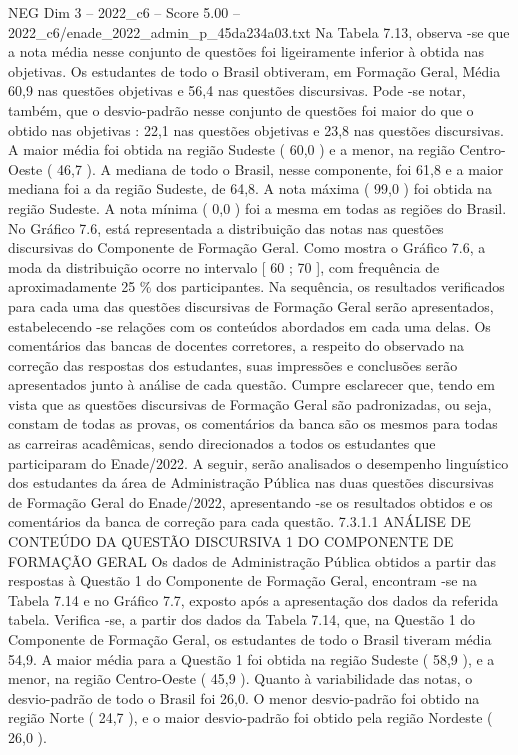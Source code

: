 \begin{textsample}{NEG Dim 3 – 2022\_c6 – Score 5.00 – 2022\_c6/enade\_2022\_admin\_p\_45da234a03.txt}
Na Tabela 7.13, observa -se que a nota média nesse conjunto de questões foi ligeiramente inferior à obtida nas objetivas.
Os estudantes de todo o Brasil obtiveram, em Formação Geral, Média 60,9 nas questões objetivas e 56,4 nas questões discursivas.
Pode -se notar, também, que o desvio-padrão nesse conjunto de questões foi maior do que o obtido nas objetivas : 22,1 nas questões objetivas e 23,8 nas questões discursivas.
A maior média foi obtida na região Sudeste ( 60,0 ) e a menor, na região Centro-Oeste ( 46,7 ).
A mediana de todo o Brasil, nesse componente, foi 61,8 e a maior mediana foi a da região Sudeste, de 64,8.
A nota máxima ( 99,0 ) foi obtida na região Sudeste.
A nota mínima ( 0,0 ) foi a mesma em todas as regiões do Brasil.
No Gráfico 7.6, está representada a distribuição das notas nas questões discursivas do Componente de Formação Geral.
Como mostra o Gráfico 7.6, a moda da distribuição ocorre no intervalo [ 60 ; 70 ], com frequência de aproximadamente 25 \% dos participantes.
Na sequência, os resultados verificados para cada uma das questões discursivas de Formação Geral serão apresentados, estabelecendo -se relações com os conteúdos abordados em cada uma delas.
Os comentários das bancas de docentes corretores, a respeito do observado na correção das respostas dos estudantes, suas impressões e conclusões serão apresentados junto à análise de cada questão.
Cumpre esclarecer que, tendo em vista que as questões discursivas de Formação Geral são padronizadas, ou seja, constam de todas as provas, os comentários da banca são os mesmos para todas as carreiras acadêmicas, sendo direcionados a todos os estudantes que participaram do Enade/2022.
A seguir, serão analisados o desempenho linguístico dos estudantes da área de Administração Pública nas duas questões discursivas de Formação Geral do Enade/2022, apresentando -se os resultados obtidos e os comentários da banca de correção para cada questão. 7.3.1.1 ANÁLISE DE CONTEÚDO DA QUESTÃO DISCURSIVA 1 DO COMPONENTE DE FORMAÇÃO GERAL Os dados de Administração Pública obtidos a partir das respostas à Questão 1 do Componente de Formação Geral, encontram -se na Tabela 7.14 e no Gráfico 7.7, exposto após a apresentação dos dados da referida tabela.
Verifica -se, a partir dos dados da Tabela 7.14, que, na Questão 1 do Componente de Formação Geral, os estudantes de todo o Brasil tiveram média 54,9.
A maior média para a Questão 1 foi obtida na região Sudeste ( 58,9 ), e a menor, na região Centro-Oeste ( 45,9 ).
Quanto à variabilidade das notas, o desvio-padrão de todo o Brasil foi 26,0.
O menor desvio-padrão foi obtido na região Norte ( 24,7 ), e o maior desvio-padrão foi obtido pela região Nordeste ( 26,0 ).

\end{textsample}
